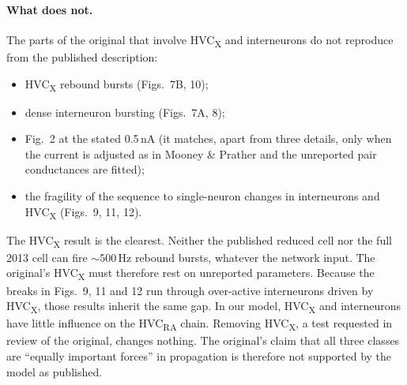 \paragraph{What does not.} The parts of the original that involve HVC\textsubscript{X} and
interneurons do not reproduce from the published description:
\begin{itemize}
\item HVC\textsubscript{X} rebound bursts (Figs.~7B, 10);
\item dense interneuron bursting (Figs.~7A, 8);
\item Fig.~2 at the stated 0.5\,nA (it matches, apart from three details, only when the current is
  adjusted as in Mooney \& Prather and the unreported pair conductances are fitted);
\item the fragility of the sequence to single-neuron changes in interneurons and
  HVC\textsubscript{X} (Figs.~9, 11, 12).
\end{itemize}
The HVC\textsubscript{X} result is the clearest. Neither the published reduced cell nor the full
2013 cell can fire $\sim$500\,Hz rebound bursts, whatever the network input. The original's
HVC\textsubscript{X} must therefore rest on unreported parameters. Because the breaks in Figs.~9,
11 and 12 run through over-active interneurons driven by HVC\textsubscript{X}, those results
inherit the same gap. In our model, HVC\textsubscript{X} and interneurons have little influence on
the HVC\textsubscript{RA} chain. Removing HVC\textsubscript{X}, a test requested in review of the
original, changes nothing. The original's claim that all three classes are ``equally important
forces'' in propagation is therefore not supported by the model as published.

